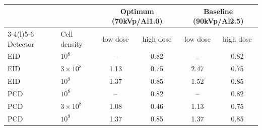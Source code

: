 \begin{tabular}{@{}llcccc@{}}
\toprule
 & & \multicolumn{2}{c}{Optimum (70kVp/Al1.0)} & \multicolumn{2}{c}{Baseline (90kVp/Al2.5)} \\
\cmidrule(lr){3-4}\cmidrule(l){5-6}
Detector & Cell density & low dose & high dose & low dose & high dose \\
\midrule
EID & $10^{8}$ & -- & 0.82 & -- & 0.82 \\
EID & $3{\times}10^{8}$ & 1.13 & 0.75 & 2.47 & 0.75 \\
EID & $10^{9}$ & 1.37 & 0.85 & 1.52 & 0.85 \\
\midrule
PCD & $10^{8}$ & -- & 0.82 & -- & 0.82 \\
PCD & $3{\times}10^{8}$ & 1.08 & 0.46 & 1.13 & 0.75 \\
PCD & $10^{9}$ & 1.37 & 0.85 & 1.37 & 0.85 \\
\bottomrule
\end{tabular}
